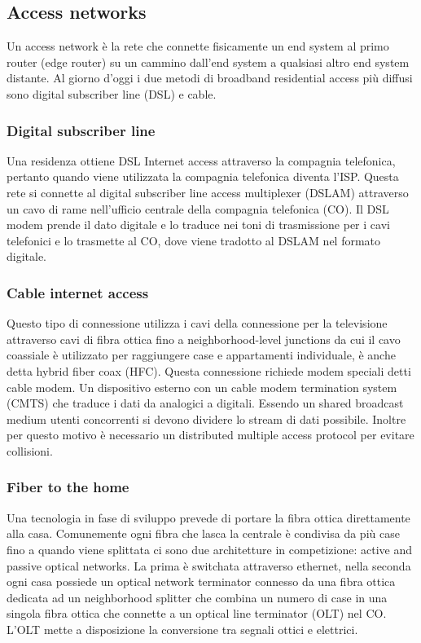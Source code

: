 \subsection{Access networks}
Un access network \`e la rete che connette fisicamente un end system al primo router (edge router) su un cammino dall'end system a qualsiasi altro end system distante. Al giorno d'oggi i due metodi di
broadband residential access pi\`u diffusi sono digital subscriber line (DSL) e cable. 
\subsubsection{Digital subscriber line}
Una residenza ottiene DSL Internet access attraverso la compagnia telefonica, pertanto quando viene utilizzata la compagnia
telefonica diventa l'ISP. Questa rete si connette al digital subscriber line access multiplexer (DSLAM) attraverso un cavo di rame nell'ufficio centrale della compagnia telefonica (CO).  Il DSL modem prende il
dato digitale e lo traduce nei toni di trasmissione per i cavi telefonici e lo trasmette al CO, dove viene tradotto al DSLAM nel formato digitale. 
\subsubsection{Cable internet access}
Questo tipo di connessione utilizza i cavi della connessione per la televisione attraverso cavi di fibra ottica fino a neighborhood-level junctions da cui il cavo coassiale \`e utilizzato per raggiungere case e 
appartamenti individuale, \`e anche detta hybrid fiber coax (HFC). Questa connessione richiede modem speciali detti cable modem. Un dispositivo esterno con un cable modem termination system (CMTS)
che traduce i dati da analogici a digitali. Essendo un shared broadcast medium utenti concorrenti si devono dividere lo stream di dati possibile. Inoltre per questo motivo \`e necessario un distributed multiple 
access protocol per evitare collisioni. 
\subsubsection{Fiber to the home}
Una tecnologia in fase di sviluppo prevede di portare la fibra ottica direttamente alla casa. Comunemente ogni fibra che lasca la centrale \`e condivisa da pi\`u case fino a quando viene splittata ci sono
due architetture in competizione: active and passive optical networks. La prima \`e switchata attraverso ethernet, nella seconda ogni casa possiede un optical network terminator connesso da una fibra ottica 
dedicata ad un neighborhood splitter che combina un numero di case in una singola fibra ottica che connette a un optical line terminator (OLT) nel CO. L'OLT mette a disposizione la conversione tra segnali
ottici e elettrici. 
